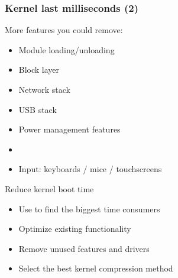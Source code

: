 \begin{frame}
\frametitle{Kernel last milliseconds (2)}
More features you could remove:
\begin{itemize}
        \item Module loading/unloading
        \item Block layer
        \item Network stack
        \item USB stack
        \item Power management features
        \item {}
        \item Input: keyboards / mice / touchscreens
\end{itemize}
\end{frame}

\setuplabframe
{Reduce kernel boot time}
{
\begin{itemize}
\item Use  to find the biggest
      time consumers
\item Optimize existing functionality
\item Remove unused features and drivers
\item Select the best kernel compression method
\end{itemize}
}

